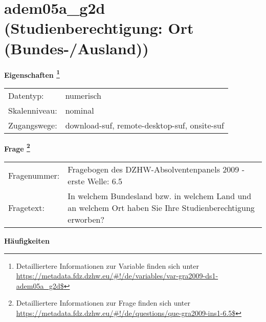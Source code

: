 
    \setcounter{footnote}{0}

    \vspace*{-1.8cm}
	\section{adem05a\_g2d (Studienberechtigung: Ort (Bundes-/Ausland))}
	\label{section:adem05a_g2d}



    \vspace*{0.5cm}
    \noindent\textbf{Eigenschaften
	\footnote{Detailliertere Informationen zur Variable finden sich unter
		\url{https://metadata.fdz.dzhw.eu/\#!/de/variables/var-gra2009-ds1-adem05a_g2d$}}}\\
	\begin{tabularx}{\hsize}{@{}lX}
	Datentyp: & numerisch \\
	Skalenniveau: & nominal \\
	Zugangswege: &
	  download-suf, 
	  remote-desktop-suf, 
	  onsite-suf
 \\
    \end{tabularx}



				\vspace*{0.5cm}
                \noindent\textbf{Frage
	                \footnote{Detailliertere Informationen zur Frage finden sich unter
		              \url{https://metadata.fdz.dzhw.eu/\#!/de/questions/que-gra2009-ins1-6.5$}}}\\
				\begin{tabularx}{\hsize}{@{}lX}
					Fragenummer: &
					  Fragebogen des DZHW-Absolventenpanels 2009 - erste Welle:
					  6.5
 \\
					Fragetext: & In welchem Bundesland bzw. in welchem Land und an welchem Ort haben Sie Ihre Studienberechtigung erworben? \\
				\end{tabularx}





        		\vspace*{0.5cm}
                \noindent\textbf{Häufigkeiten}

